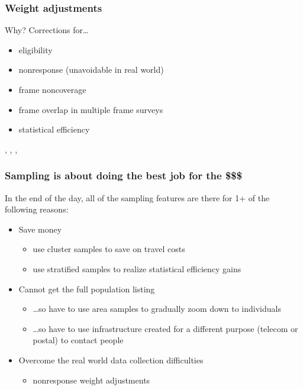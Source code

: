 \documentclass{beamer}
\begin{document}
\begin{frame}\frametitle{Weight adjustments}

Why? Corrections for\ldots

\begin{itemize}
    \item eligibility
    \item nonresponse (unavoidable in real world)
    \item frame noncoverage
    \item frame overlap in multiple frame surveys
    \item statistical efficiency
\end{itemize}

\citet{kalton:flores:cervantes:2003},
\citet{valliant:dever:kreuter:2013},
\citet{valliant:dever:2017},
\citet{kolenikov:2016}

\end{frame}

\begin{frame}\frametitle{Sampling is about doing the best job for the \$\$\$}

In the end of the day, all of the sampling features are there for 1+ of the following reasons:

\begin{itemize}
    \item Save money
        \begin{itemize}
            \item use cluster samples to save on travel costs
            \item use stratified samples to realize statistical efficiency gains
        \end{itemize}
    \item Cannot get the full population listing
        \begin{itemize}
            \item \ldots so have to use area samples to gradually zoom down to individuals
            \item \ldots so have to use infrastructure created for a different purpose (telecom or postal) to contact people
        \end{itemize}
    \item Overcome the real world data collection difficulties
        \begin{itemize}
            \item nonresponse weight adjustments
        \end{itemize}
\end{itemize}

\end{frame}
\end{document}
